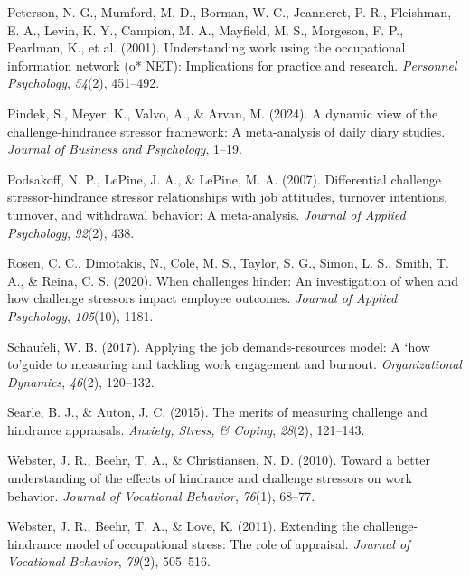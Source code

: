 \documentclass[
  man,mask]{apa7}
\newlength{\cslhangindent}
\newlength{\cslentryspacingunit} %
\newenvironment{CSLReferences}[2] %
 {%
  \setlength{\parindent}{0pt}
  \ifodd #1
  \let\oldpar\par
  \def\par{\hangindent=\cslhangindent\oldpar}
  \fi
  \setlength{\parskip}{#2\cslentryspacingunit}
 }%
 {}
\begin{document}
\begin{CSLReferences}{1}{0}
\leavevmode{}%
Peterson, N. G., Mumford, M. D., Borman, W. C., Jeanneret, P. R., Fleishman, E. A., Levin, K. Y., Campion, M. A., Mayfield, M. S., Morgeson, F. P., Pearlman, K., et al. (2001). Understanding work using the occupational information network (o* NET): Implications for practice and research. \emph{Personnel Psychology}, \emph{54}(2), 451--492.

\leavevmode{}%
Pindek, S., Meyer, K., Valvo, A., \& Arvan, M. (2024). A dynamic view of the challenge-hindrance stressor framework: A meta-analysis of daily diary studies. \emph{Journal of Business and Psychology}, 1--19.

\leavevmode{}%
Podsakoff, N. P., LePine, J. A., \& LePine, M. A. (2007). Differential challenge stressor-hindrance stressor relationships with job attitudes, turnover intentions, turnover, and withdrawal behavior: A meta-analysis. \emph{Journal of Applied Psychology}, \emph{92}(2), 438.

\leavevmode{}%
Rosen, C. C., Dimotakis, N., Cole, M. S., Taylor, S. G., Simon, L. S., Smith, T. A., \& Reina, C. S. (2020). When challenges hinder: An investigation of when and how challenge stressors impact employee outcomes. \emph{Journal of Applied Psychology}, \emph{105}(10), 1181.

\leavevmode{}%
Schaufeli, W. B. (2017). Applying the job demands-resources model: A `how to'guide to measuring and tackling work engagement and burnout. \emph{Organizational Dynamics}, \emph{46}(2), 120--132.

\leavevmode{}%
Searle, B. J., \& Auton, J. C. (2015). The merits of measuring challenge and hindrance appraisals. \emph{Anxiety, Stress, \& Coping}, \emph{28}(2), 121--143.

\leavevmode{}%
Webster, J. R., Beehr, T. A., \& Christiansen, N. D. (2010). Toward a better understanding of the effects of hindrance and challenge stressors on work behavior. \emph{Journal of Vocational Behavior}, \emph{76}(1), 68--77.

\leavevmode{}%
Webster, J. R., Beehr, T. A., \& Love, K. (2011). Extending the challenge-hindrance model of occupational stress: The role of appraisal. \emph{Journal of Vocational Behavior}, \emph{79}(2), 505--516.


\end{CSLReferences}
\end{document}
